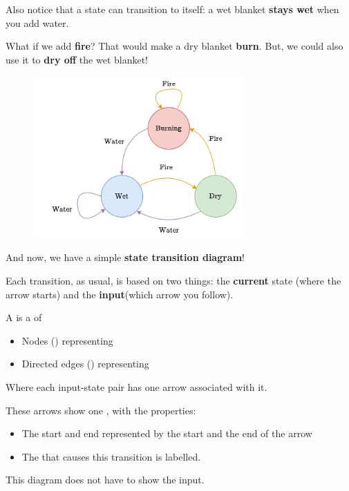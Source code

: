         Also notice that a state can transition to itself: a wet blanket \textbf{stays wet} when you add water.
        
        What if we add \textbf{fire}? That would make a dry blanket \textbf{burn}. But, we could also use it to \textbf{dry off} the wet blanket!
        
        \begin{figure}[H]
            \centering
            \includegraphics[width=80mm,scale=0.4]{images/rnn_images/std_fire_and_water.png}
        \end{figure}
        
        And now, we have a simple \textbf{state transition diagram}!
        
        Each transition, as usual, is based on two things: the \textbf{current} state (where the arrow starts) and the \textbf{input}(which arrow you follow).\\
        
        \begin{definition}
            A  is a  of 
            
            \begin{itemize}
                \item Nodes () representing 
                \item Directed edges () representing 
            \end{itemize}
            
            Where each input-state pair has one arrow associated with it.
            
            These arrows show one , with the properties:
            
            \begin{itemize}
                \item The start and end  represented by the start and the end of the arrow
                \item The  that causes this transition is labelled.
            \end{itemize}
            
            This diagram does not have to show the input.
        \end{definition}
        
